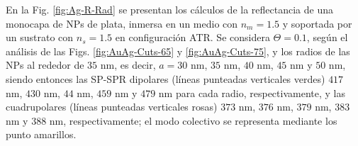 En la Fig. \ref{fig:Ag-R-Rad}	 se presentan los cálculos de la reflectancia de una monocapa de NPs  de plata, inmersa en un medio con $n_m=1.5$ y soportada por un sustrato con $n_s=1.5$ en configuración ATR. Se considera  $\Theta=0.1$,  según el análisis de las Figs. \ref{fig:AuAg-Cuts-65} y \ref{fig:AuAg-Cuts-75}, y los radios de las NPs al rededor de $35$ nm, es decir, $a=30$ nm, $35$ nm, $40$ nm, $45$ nm y $50$ nm, siendo entonces las SP-SPR dipolares (líneas punteadas verticales verdes) $417$ nm, $430$ nm, $44$ nm, $459$ nm y $479$ nm para cada radio, respectivamente, y las cuadrupolares (líneas punteadas verticales rosas) $373$ nm, $376$ nm, $379$ nm, $383$ nm y $388$ nm, respectivamente; el modo colectivo se representa mediante los punto amarillos.

\begin{figure}[h!]\centering
{}
\end{figure}
